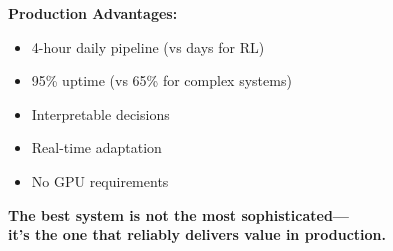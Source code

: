 \documentclass[11pt,a4paper]{report}
\begin{document}
\textbf{Production Advantages:}
\begin{itemize}
\item 4-hour daily pipeline (vs days for RL)
\item 95\% uptime (vs 65\% for complex systems)
\item Interpretable decisions
\item Real-time adaptation
\item No GPU requirements
\end{itemize}

\vspace{1cm}
\begin{center}
\Large\textbf{The best system is not the most sophisticated—\\
it's the one that reliably delivers value in production.}
\end{center}
\end{document}
